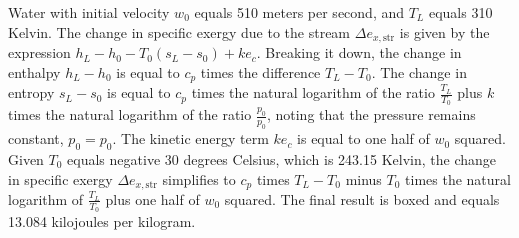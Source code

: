 Water with initial velocity \( w_0 \) equals 510 meters per second, and \( T_L \) equals 310 Kelvin. The change in specific exergy due to the stream \( \Delta e_{x,\text{str}} \) is given by the expression \( h_L - h_0 - T_0 (s_L - s_0) + ke_c \). Breaking it down, the change in enthalpy \( h_L - h_0 \) is equal to \( c_p \) times the difference \( T_L - T_0 \). The change in entropy \( s_L - s_0 \) is equal to \( c_p \) times the natural logarithm of the ratio \( \frac{T_L}{T_0} \) plus \( k \) times the natural logarithm of the ratio \( \frac{p_0}{p_0} \), noting that the pressure remains constant, \( p_0 = p_0 \). The kinetic energy term \( ke_c \) is equal to one half of \( w_0 \) squared. Given \( T_0 \) equals negative 30 degrees Celsius, which is 243.15 Kelvin, the change in specific exergy \( \Delta e_{x,\text{str}} \) simplifies to \( c_p \) times \( T_L - T_0 \) minus \( T_0 \) times the natural logarithm of \( \frac{T_L}{T_0} \) plus one half of \( w_0 \) squared. The final result is boxed and equals 13.084 kilojoules per kilogram.